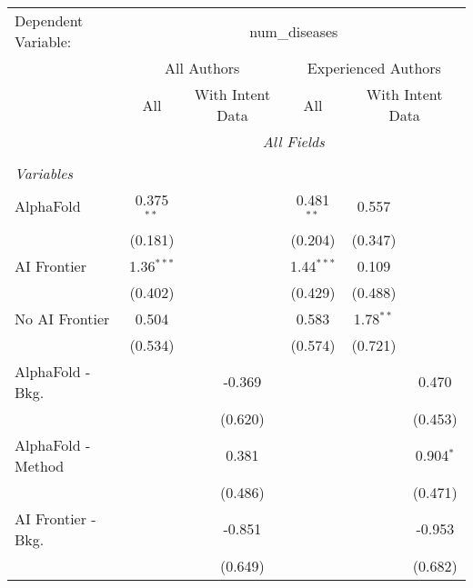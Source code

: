 \begingroup
\centering
\begin{tabular}{lcccccc}
   \tabularnewline \midrule \midrule
   Dependent Variable: & \multicolumn{6}{c}{num\_diseases}\\
 & \multicolumn{3}{c}{All Authors} & \multicolumn{3}{c}{Experienced Authors} \\
\cmidrule(lr){2-4} \cmidrule(lr){5-7}
 & \multicolumn{1}{c}{All} & \multicolumn{2}{c}{With Intent Data} & \multicolumn{1}{c}{All} & \multicolumn{2}{c}{With Intent Data} \\
\cmidrule(lr){2-2} \cmidrule(lr){3-4} \cmidrule(lr){5-5} \cmidrule(lr){6-7}
 & \multicolumn{6}{c}{\textit{All Fields}} \\ \\
   \emph{Variables}\\
   AlphaFold               & 0.375$^{**}$ &         &              & 0.481$^{**}$ & 0.557       &   \\   
                           & (0.181)      &         &              & (0.204)      & (0.347)     &   \\   
   AI Frontier             & 1.36$^{***}$ &         &              & 1.44$^{***}$ & 0.109       &   \\   
                           & (0.402)      &         &              & (0.429)      & (0.488)     &   \\   
   No AI Frontier          & 0.504        &         &              & 0.583        & 1.78$^{**}$ &   \\   
                           & (0.534)      &         &              & (0.574)      & (0.721)     &   \\   
   AlphaFold - Bkg.        &              &         & -0.369       &              &             & 0.470\\   
                           &              &         & (0.620)      &              &             & (0.453)\\   
   AlphaFold - Method      &              &         & 0.381        &              &             & 0.904$^{*}$\\   
                           &              &         & (0.486)      &              &             & (0.471)\\   
   AI Frontier - Bkg.      &              &         & -0.851       &              &             & -0.953\\   
                           &              &         & (0.649)      &              &             & (0.682)\\   

\end{tabular}
